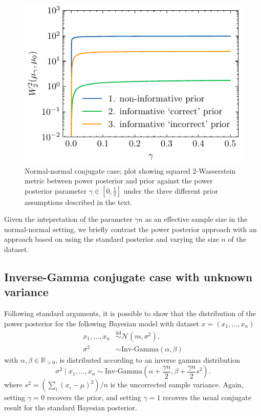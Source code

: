 \documentclass[12pt]{article}
\begin{document}
\begin{figure}
\begin{center}
\includegraphics{imgs/normal_normal_wasserstein_distance_different_priors.pdf}
\end{center}
\caption{Normal-normal conjugate case; plot showing squared
2-Wasserstein metric between power posterior and prior against the
power posterior parameter $\gamma \in [0, \frac{1}{2}]$ under the three
different prior assumptions described in the text.}\label{fig:normal_normal_wasserstein_distance_different_priors}
\end{figure}

Given the intepretation of the parameter $\gamma n$ as an effective sample size
in the normal-normal setting, we briefly contrast the power posterior approach
with an approach based on using the standard posterior and varying the size $n$
of the dataset.

\subsection{Inverse-Gamma conjugate case with unknown variance}
Following standard arguments, it is possible to show that the distribution of
the power posterior for the following Bayesian model with dataset $x = (x_1,
\ldots, x_n)$
\begin{subequations}
\begin{align}
x_1, \ldots, x_n &\overset{\mathrm{iid}}{\sim} \mathcal{N}(m, \sigma^2), \\
\sigma^2 &\sim \text{Inv-Gamma}(\alpha, \beta)
\end{align}
\end{subequations}
with $\alpha, \beta \in \mathbb{R}_{>0}$, is distributed according to an
inverse gamma distribution
\begin{equation*}
\sigma^2 \; | \; x_1, \ldots, x_n \sim \text{Inv-Gamma}\left( \alpha + \frac{\gamma n}{2}, \beta + \frac{\gamma n}{2} s^2 \right). 
\end{equation*}
where $s^2 = (\sum_{i} \left( x_i - \mu \right)^2)/n$ is the uncorrected sample
variance. Again, setting $\gamma = 0$ recovers the prior, and setting $\gamma =
1$ recovers the usual conjugate result for the standard Bayesian posterior.
\end{document}
